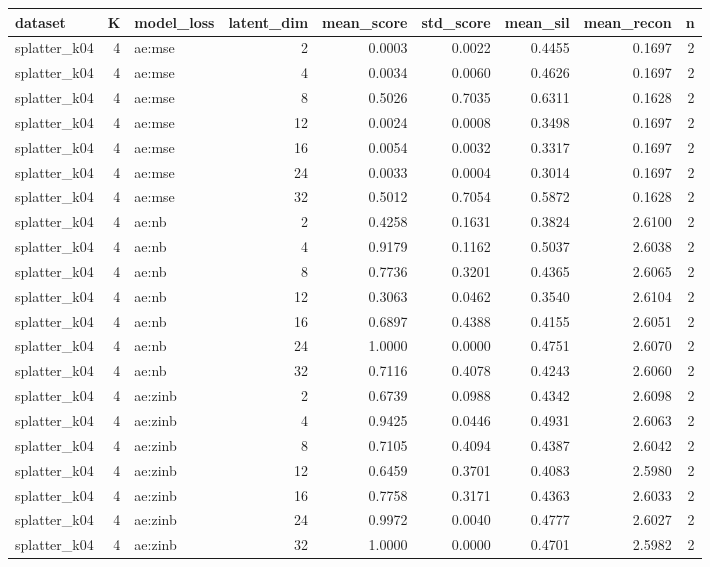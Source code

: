 \begin{tabular}{lrlrrrrrr}
\toprule
dataset & K & model\_loss & latent\_dim & mean\_score & std\_score & mean\_sil & mean\_recon & n \\
\midrule
splatter\_k04 & 4 & ae:mse & 2 & 0.0003 & 0.0022 & 0.4455 & 0.1697 & 2 \\
splatter\_k04 & 4 & ae:mse & 4 & 0.0034 & 0.0060 & 0.4626 & 0.1697 & 2 \\
splatter\_k04 & 4 & ae:mse & 8 & 0.5026 & 0.7035 & 0.6311 & 0.1628 & 2 \\
splatter\_k04 & 4 & ae:mse & 12 & 0.0024 & 0.0008 & 0.3498 & 0.1697 & 2 \\
splatter\_k04 & 4 & ae:mse & 16 & 0.0054 & 0.0032 & 0.3317 & 0.1697 & 2 \\
splatter\_k04 & 4 & ae:mse & 24 & 0.0033 & 0.0004 & 0.3014 & 0.1697 & 2 \\
splatter\_k04 & 4 & ae:mse & 32 & 0.5012 & 0.7054 & 0.5872 & 0.1628 & 2 \\
splatter\_k04 & 4 & ae:nb & 2 & 0.4258 & 0.1631 & 0.3824 & 2.6100 & 2 \\
splatter\_k04 & 4 & ae:nb & 4 & 0.9179 & 0.1162 & 0.5037 & 2.6038 & 2 \\
splatter\_k04 & 4 & ae:nb & 8 & 0.7736 & 0.3201 & 0.4365 & 2.6065 & 2 \\
splatter\_k04 & 4 & ae:nb & 12 & 0.3063 & 0.0462 & 0.3540 & 2.6104 & 2 \\
splatter\_k04 & 4 & ae:nb & 16 & 0.6897 & 0.4388 & 0.4155 & 2.6051 & 2 \\
splatter\_k04 & 4 & ae:nb & 24 & 1.0000 & 0.0000 & 0.4751 & 2.6070 & 2 \\
splatter\_k04 & 4 & ae:nb & 32 & 0.7116 & 0.4078 & 0.4243 & 2.6060 & 2 \\
splatter\_k04 & 4 & ae:zinb & 2 & 0.6739 & 0.0988 & 0.4342 & 2.6098 & 2 \\
splatter\_k04 & 4 & ae:zinb & 4 & 0.9425 & 0.0446 & 0.4931 & 2.6063 & 2 \\
splatter\_k04 & 4 & ae:zinb & 8 & 0.7105 & 0.4094 & 0.4387 & 2.6042 & 2 \\
splatter\_k04 & 4 & ae:zinb & 12 & 0.6459 & 0.3701 & 0.4083 & 2.5980 & 2 \\
splatter\_k04 & 4 & ae:zinb & 16 & 0.7758 & 0.3171 & 0.4363 & 2.6033 & 2 \\
splatter\_k04 & 4 & ae:zinb & 24 & 0.9972 & 0.0040 & 0.4777 & 2.6027 & 2 \\
splatter\_k04 & 4 & ae:zinb & 32 & 1.0000 & 0.0000 & 0.4701 & 2.5982 & 2 \\

\end{tabular}

